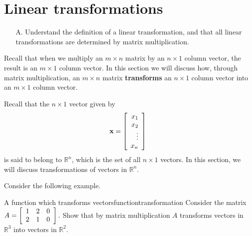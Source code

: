 \section{Linear transformations}

\begin{outcome}
\begin{enumerate}
\item[A.]  Understand the definition of a linear transformation, and that all linear transformations are determined by matrix multiplication.
\end{enumerate}
\end{outcome}

Recall that when we multiply an $m\times n$ matrix by an $n\times 1 $
column vector, the result is an $m\times 1$ column vector. In this
section we will discuss how, through matrix multiplication, an $m
\times n$ matrix \textbf{transforms} an $n\times 1$ column vector into
an $m \times 1$ column vector.

Recall that the $n \times 1$ vector given by
\begin{equation*}
{\bf x} = 
\left[
\begin{array}{r}
x_1 \\
x_2\\ 
\vdots \\
x_n
\end{array}
\right]
\end{equation*}
is said to belong to $\mathbb{R}^n$, which is the set of all $n \times 1$ vectors. In this section, we will discuss transformations of vectors in $\mathbb{R}^n.$ 

Consider the following example. 

\begin{example}{A function which transforms vectors}{functiontransformation}
Consider the matrix $A = \left[
\begin{array}{ccc}
1 & 2 & 0 \\
2 & 1 & 0
\end{array}
\right] .$ 
Show that by matrix multiplication $A$ transforms vectors in $\mathbb{R}^3$ into vectors in $\mathbb{R}^2$.
\end{example}

